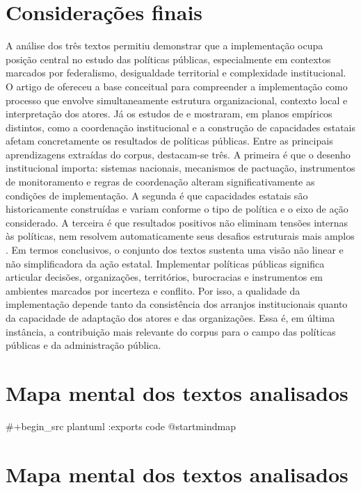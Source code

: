 \documentclass[12pt,a4paper]{article}
\begin{document}
\section{Considerações finais}
\label{sec:org89a8135}
A análise dos três textos permitiu demonstrar que a implementação ocupa posição central no estudo das políticas públicas, especialmente em contextos marcados por federalismo, desigualdade territorial e complexidade institucional. O artigo de \textcite{dascenzi2013_implementacao_de} ofereceu a base conceitual para compreender a implementação como processo que envolve simultaneamente estrutura organizacional, contexto local e interpretação dos atores. Já os estudos de \textcite{bichir2020_sistemas_nacionais} e \textcite{mello2017_evolucao_do} mostraram, em planos empíricos distintos, como a coordenação institucional e a construção de capacidades estatais afetam concretamente os resultados de políticas públicas.
Entre as principais aprendizagens extraídas do corpus, destacam-se três. A primeira é que o desenho institucional importa: sistemas nacionais, mecanismos de pactuação, instrumentos de monitoramento e regras de coordenação alteram significativamente as condições de implementação. A segunda é que capacidades estatais são historicamente construídas e variam conforme o tipo de política e o eixo de ação considerado. A terceira é que resultados positivos não eliminam tensões internas às políticas, nem resolvem automaticamente seus desafios estruturais mais amplos \autocites{bichir2020_sistemas_nacionais}{mello2017_evolucao_do}.
Em termos conclusivos, o conjunto dos textos sustenta uma visão não linear e não simplificadora da ação estatal. Implementar políticas públicas significa articular decisões, organizações, territórios, burocracias e instrumentos em ambientes marcados por incerteza e conflito. Por isso, a qualidade da implementação depende tanto da consistência dos arranjos institucionais quanto da capacidade de adaptação dos atores e das organizações. Essa é, em última instância, a contribuição mais relevante do corpus para o campo das políticas públicas e da administração pública.

\section{Mapa mental dos textos analisados}
\label{sec:org350e5eb}

\#+begin\_src plantuml :exports code
@startmindmap
\section{Mapa mental dos textos analisados}
\label{sec:orgb9c40ed}
\end{document}
